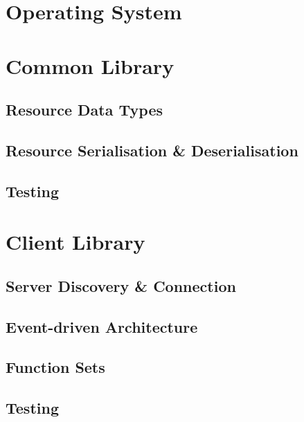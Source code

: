 \section{Operating System}



\section{Common Library}



\subsection{Resource Data Types}

\subsection{Resource Serialisation \& Deserialisation}

\subsection{Testing}



\section{Client Library}

\subsection{Server Discovery \& Connection}

\subsection{Event-driven Architecture}

\subsection{Function Sets}

\subsection{Testing}









